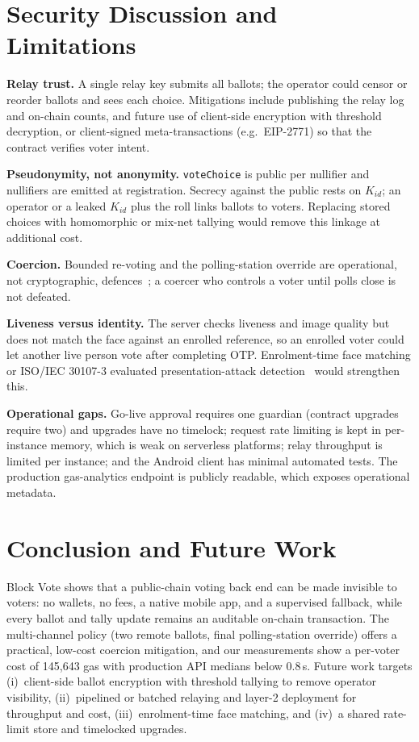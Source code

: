 \documentclass[conference]{IEEEtran}
\newcommand{\code}[1]{\texttt{\small #1}}
\begin{document}
\section{Security Discussion and Limitations}
\label{sec:limits}

\textbf{Relay trust.} A single relay key submits all ballots; the operator could censor or reorder ballots and sees each choice. Mitigations include publishing the relay log and on-chain counts, and future use of client-side encryption with threshold decryption, or client-signed meta-transactions (e.g.\ EIP-2771) so that the contract verifies voter intent.

\textbf{Pseudonymity, not anonymity.} \code{voteChoice} is public per nullifier and nullifiers are emitted at registration. Secrecy against the public rests on $K_{id}$; an operator or a leaked $K_{id}$ plus the roll links ballots to voters. Replacing stored choices with homomorphic or mix-net tallying would remove this linkage at additional cost.

\textbf{Coercion.} Bounded re-voting and the polling-station override are operational, not cryptographic, defences~\cite{juels2005}; a coercer who controls a voter until polls close is not defeated.

\textbf{Liveness versus identity.} The server checks liveness and image quality but does not match the face against an enrolled reference, so an enrolled voter could let another live person vote after completing OTP. Enrolment-time face matching or ISO/IEC 30107-3 evaluated presentation-attack detection~\cite{iso30107} would strengthen this.

\textbf{Operational gaps.} Go-live approval requires one guardian (contract upgrades require two) and upgrades have no timelock; request rate limiting is kept in per-instance memory, which is weak on serverless platforms; relay throughput is limited per instance; and the Android client has minimal automated tests. The production gas-analytics endpoint is publicly readable, which exposes operational metadata.

\section{Conclusion and Future Work}
Block Vote shows that a public-chain voting back end can be made invisible to voters: no wallets, no fees, a native mobile app, and a supervised fallback, while every ballot and tally update remains an auditable on-chain transaction. The multi-channel policy (two remote ballots, final polling-station override) offers a practical, low-cost coercion mitigation, and our measurements show a per-voter cost of 145,643 gas with production API medians below 0.8\,s. Future work targets (i)~client-side ballot encryption with threshold tallying to remove operator visibility, (ii)~pipelined or batched relaying and layer-2 deployment for throughput and cost, (iii)~enrolment-time face matching, and (iv)~a shared rate-limit store and timelocked upgrades.
\end{document}
